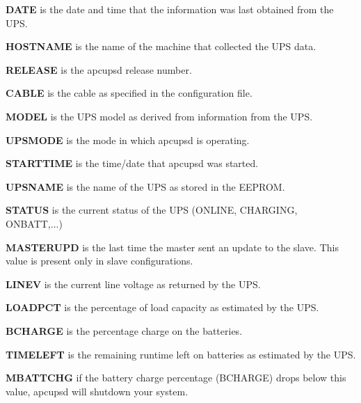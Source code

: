 {{{{{{{{{{{{{{{\begin{description}
\item {\bf DATE}
is the date and time that the information was last obtained from the UPS.  

\item {\bf HOSTNAME}
is the name of the machine that collected the UPS data.  

\item {\bf RELEASE}
is the apcupsd release number.  

\item {\bf CABLE}
is the cable as specified in the configuration file.  

\item {\bf MODEL}
is the UPS model as derived from information from the UPS.  

\item {\bf UPSMODE}
is the mode in which apcupsd is operating.  

\item {\bf STARTTIME}
is the time/date that apcupsd was started.  

\item {\bf UPSNAME}
is the name of the UPS as stored in the EEPROM.  

\item {\bf STATUS}
is the current status of the UPS (ONLINE, CHARGING, ONBATT,...)  

\item {\bf MASTERUPD}
is the last time the master sent an update to the slave. This value is present
only in slave configurations.  

\item {\bf LINEV}
is the current line voltage as returned by the UPS.  

\item {\bf LOADPCT}
is the percentage of load capacity as estimated by the UPS.  

\item {\bf BCHARGE}
is the percentage charge on the batteries.  

\item {\bf TIMELEFT}
is the remaining runtime left on batteries as estimated by the UPS.  

\item {\bf MBATTCHG}
if the battery charge percentage (BCHARGE) drops below this value, apcupsd
will shutdown your system.  


\end{description}}}}}}}}}}}}}}}}
